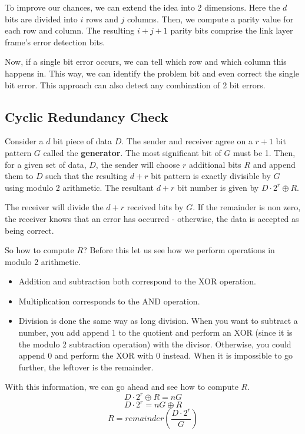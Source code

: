 \documentclass[12pt,letterpaper]{book}
\theoremstyle{definition}
\begin{document}
To improve our chances, we can extend the idea into 2 dimensions. Here the $d$ bits are divided into $i$ rows and $j$ columns. Then, we compute a parity value for each row and column. The resulting $i+j+1$ parity bits comprise the link layer frame's error detection bits.

Now, if a single bit error occurs, we can tell which row and which column this happens in. This way, we can identify the problem bit and even correct the single bit error. This approach can also detect any combination of 2 bit errors.

\subsection{Cyclic Redundancy Check}

Consider a $d$ bit piece of data $D$. The sender and receiver agree on a $r+1$ bit pattern $G$ called the \textbf{generator}. The most significant bit of $G$ must be 1. Then, for a given set of data, $D$, the sender will choose $r$ additional bits $R$ and append them to $D$ such that the resulting $d+r$ bit pattern is exactly divisible by $G$ using modulo 2 arithmetic. The resultant $d+r$ bit number is given by $D \cdot 2^r \oplus R$.

The receiver will divide the $d+r$ received bits by $G$. If the remainder is non zero, the receiver knows that an error has occurred - otherwise, the data is accepted as being correct.

So how to compute $R$? Before this let us see how we perform operations in modulo 2 arithmetic.

\begin{itemize}
  \item Addition and subtraction both correspond to the XOR operation.
  \item Multiplication corresponds to the AND operation.
  \item Division is done the same way as long division. When you want to subtract a number, you add append 1 to the quotient and perform an XOR (since it is the modulo 2 subtraction operation) with the divisor. Otherwise, you could append 0 and perform the XOR with 0 instead. When it is impossible to go further, the leftover is the remainder.
\end{itemize}

With this information, we can go ahead and see how to compute $R$.
\[D \cdot 2^r \oplus R = nG\]
\[D \cdot 2^r = nG \oplus R\]
\[R = remainder(\frac{D \cdot 2^r}{G})\]
\end{document}
